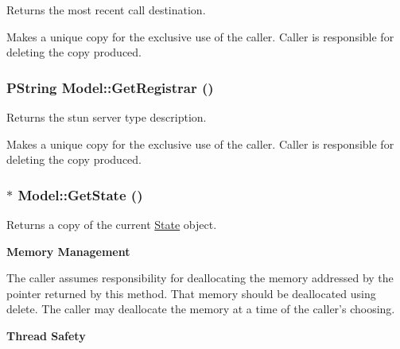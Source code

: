 Returns the most recent call destination. 

Makes a unique copy for the exclusive use of the caller. Caller is responsible for deleting the copy produced. \hypertarget{classModel_5d7dd928f54ce00e04f1763728b9b85a}{
\subsubsection[{GetRegistrar}]{\setlength{\rightskip}{0pt plus 5cm}PString Model::GetRegistrar ()}}
\label{classModel_5d7dd928f54ce00e04f1763728b9b85a}


Returns the stun server type description. 

Makes a unique copy for the exclusive use of the caller. Caller is responsible for deleting the copy produced. \hypertarget{classModel_aca96bcd2e019aad9c4d4d7203b77cce}{
\subsubsection[{GetState}]{ $\ast$ Model::GetState ()}}
\label{classModel_aca96bcd2e019aad9c4d4d7203b77cce}


Returns a copy of the current \hyperlink{classState}{State} object. 

{\bf Memory Management} 

The caller assumes responsibility for deallocating the memory addressed by the pointer returned by this method. That memory should be deallocated using delete. The caller may deallocate the memory at a time of the caller's choosing. 

{\bf Thread Safety} 


